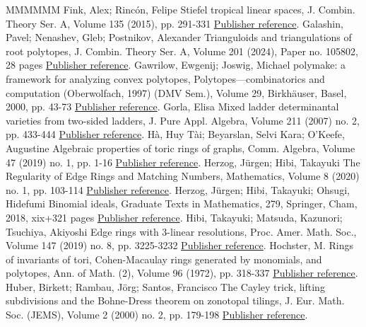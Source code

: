 \documentclass[11pt]{article}
\theoremstyle{definition}
\numberwithin{equation}{section}
\begin{document}
\begin{thebibliography}{MMMMMM}
 Fink, Alex; Rincón, Felipe Stiefel tropical linear spaces, J. Combin. Theory Ser. A, Volume 135 (2015), pp. 291-331 \href{https://alco.centre-mersenne.org/articles/10.5802/alco.404/#fink2015stiefel}{Publisher reference}.
 Galashin, Pavel; Nenashev, Gleb; Postnikov, Alexander Trianguloids and triangulations of root polytopes, J. Combin. Theory Ser. A, Volume 201 (2024), Paper no. 105802, 28 pages \href{https://alco.centre-mersenne.org/articles/10.5802/alco.404/#galashin2018trianguloids}{Publisher reference}.
 Gawrilow, Ewgenij; Joswig, Michael polymake: a framework for analyzing convex polytopes, Polytopes—combinatorics and computation (Oberwolfach, 1997) (DMV Sem.), Volume 29, Birkhäuser, Basel, 2000, pp. 43-73 \href{https://alco.centre-mersenne.org/articles/10.5802/alco.404/#polymake:2000}{Publisher reference}.
 Gorla, Elisa Mixed ladder determinantal varieties from two-sided ladders, J. Pure Appl. Algebra, Volume 211 (2007) no. 2, pp. 433-444 \href{https://alco.centre-mersenne.org/articles/10.5802/alco.404/#gorla2007mixed}{Publisher reference}.
 Hà, Huy Tài; Beyarslan, Selvi Kara; O’Keefe, Augustine Algebraic properties of toric rings of graphs, Comm. Algebra, Volume 47 (2019) no. 1, pp. 1-16 \href{https://alco.centre-mersenne.org/articles/10.5802/alco.404/#ha2019}{Publisher reference}.
 Herzog, Jürgen; Hibi, Takayuki The Regularity of Edge Rings and Matching Numbers, Mathematics, Volume 8 (2020) no. 1, pp. 103-114 \href{https://alco.centre-mersenne.org/articles/10.5802/alco.404/#herzog2020regularity}{Publisher reference}.
 Herzog, Jürgen; Hibi, Takayuki; Ohsugi, Hidefumi Binomial ideals, Graduate Texts in Mathematics, 279, Springer, Cham, 2018, xix+321 pages \href{https://alco.centre-mersenne.org/articles/10.5802/alco.404/#HHOBinomial}{Publisher reference}.
 Hibi, Takayuki; Matsuda, Kazunori; Tsuchiya, Akiyoshi Edge rings with 3-linear resolutions, Proc. Amer. Math. Soc., Volume 147 (2019) no. 8, pp. 3225-3232 \href{https://alco.centre-mersenne.org/articles/10.5802/alco.404/#hibi3linear2019}{Publisher reference}.
 Hochster, M. Rings of invariants of tori, Cohen-Macaulay rings generated by monomials, and polytopes, Ann. of Math. (2), Volume 96 (1972), pp. 318-337 \href{https://alco.centre-mersenne.org/articles/10.5802/alco.404/#hochster1972}{Publisher reference}.
 Huber, Birkett; Rambau, Jörg; Santos, Francisco The Cayley trick, lifting subdivisions and the Bohne-Dress theorem on zonotopal tilings, J. Eur. Math. Soc. (JEMS), Volume 2 (2000) no. 2, pp. 179-198 \href{https://alco.centre-mersenne.org/articles/10.5802/alco.404/#huber2000cayley}{Publisher reference}.

\end{thebibliography}
\end{document}
